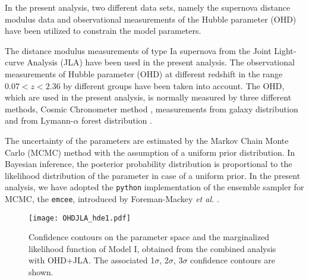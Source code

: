 \documentclass[11pt]{article}
\begin{document}
In the present analysis, two different data sets, namely the supernova distance modulus data and observational measurements of the Hubble parameter (OHD) have been utilized to constrain the model parameters.

\par The distance modulus measurements of type Ia supernova from the Joint Light-curve Analysis (JLA) \cite{jla} have been used in the present analysis. The observational measurements of Hubble parameter (OHD) at different redshift in the range $0.07<z<2.36$ by different groups have been taken into account.  The OHD, which are used in the present analysis, is normally measured by three different methods, Cosmic Chronometer method \cite{ohdcc}, measurements from galaxy distribution \cite{ohdbao} and from Lymann-$\alpha$ forest distribution \cite{ohdLya}.


\par The uncertainty of the parameters are estimated by the Markov Chain Monte Carlo (MCMC) method with the assumption of a uniform prior distribution. In Bayesian inference, the posterior probability distribution is proportional to the likelihood distribution of the parameter in case of a uniform prior. In the present analysis, we have adopted the \texttt{python} implementation of the ensemble sampler for MCMC, the \texttt{emcee}, introduced by Foreman-Mackey {\it et al.} \cite{emcee}.


\begin{figure}[tb]
\begin{center}
\texttt{[image: OHDJLA\_hde1.pdf]}
\end{center}
\caption{{\small Confidence contours on the parameter space and the marginalized likelihood function of Model I, obtained from the combined analysis with OHD+JLA. The associated 1$\sigma$, 2$\sigma$, 3$\sigma$ confidence contours are shown.}}
\label{Model1contour}
\end{figure}
\begin{table}[tb]
\caption{{\small The parameter values and the associated 1$\sigma$ uncertainty of the parameters for the reconstructed model. The parameters are constrained in the combined analysis with JLA+OHD.}}
\begin{center}
\end{center}
\label{resulttable}
\end{table}
\end{document}
